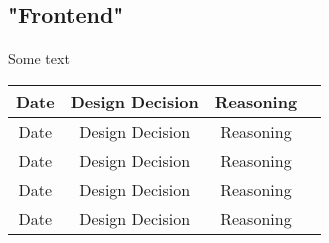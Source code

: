 \documentclass[12pt]{article}
\begin{document}
\subsection{"Frontend"}
\paragraph{}
	Some text
	

		\begin{center}
		\begin{tabular}{ |c|c|c|c| } 
		\hline
		Date & Design Decision & Reasoning \\
		\hline
		Date & Design Decision & Reasoning \\
		\hline
		Date & Design Decision & Reasoning \\
		\hline
		Date & Design Decision & Reasoning \\
		\hline
		Date & Design Decision & Reasoning \\
		\hline
		\end{tabular}
		\end{center}	

\end{document}
